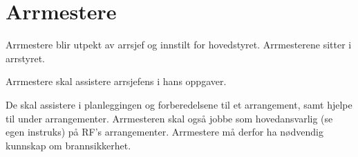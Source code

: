 \section{Arrmestere}

Arrmestere blir utpekt av arrsjef og innstilt for hovedstyret.
Arrmesterene sitter i arrstyret.

Arrmestere skal assistere arrsjefens i hans oppgaver.

De skal assistere i
planleggingen og forberedelsene til et arrangement, samt hjelpe til under
arrangementer. Arrmesteren skal også jobbe som hovedansvarlig (se egen
instruks) på RF's arrangementer. Arrmestere må derfor ha nødvendig
kunnskap om brannsikkerhet.

